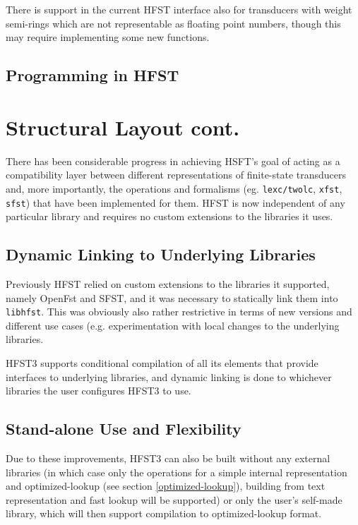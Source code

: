 \documentclass{llncs}
\begin{document}
There is support in the current HFST interface also for transducers
with weight semi-rings which are not representable as floating point
numbers, though this may require implementing some new functions.

\subsection{Programming in HFST}

\section{Structural Layout cont.}
There has been considerable progress in achieving HSFT's goal of acting as a
compatibility layer between different representations of finite-state
transducers and, more importantly, the operations and formalisms (eg.
\verb+lexc/twolc+, \verb+xfst+, \verb+sfst+) that have been implemented
for them. HFST is now independent of any particular library and requires no
custom extensions to the libraries it uses.

\subsection{Dynamic Linking to Underlying Libraries}
Previously HFST relied on custom extensions to the libraries it supported,
namely OpenFst and SFST, and it was necessary to statically link them into
\verb+libhfst+. This was obviously also rather restrictive in terms of
new versions and different use cases (e.g. experimentation with local changes to
the underlying libraries.

HFST3 supports conditional compilation of all its elements that provide
interfaces to underlying libraries, and dynamic linking is done to whichever
libraries the user configures HFST3 to use.

\subsection{Stand-alone Use and Flexibility}
Due to these improvements, HFST3 can also be built without any external
libraries (in which case only the operations for a simple internal
representation and optimized-lookup (see section \ref{optimized-lookup}),
building from text representation and fast lookup will be supported) or only
the user's self-made library, which will then support compilation to
optimized-lookup format.
\end{document}
